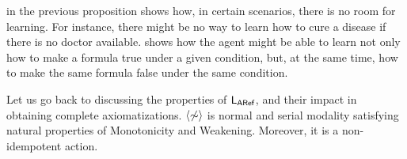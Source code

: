  in the previous proposition shows how, in certain scenarios, there is
no room for learning. For instance, there might be no way to learn how
to cure a disease if there is no doctor
available.  shows how the agent might be able
to learn not only how to make a formula true under a given condition,
but, at the same time, how to make the same formula false under the same condition.

Let us go back to discussing the properties of $\mathsf{L_{ARef}}$, and their impact in obtaining complete axiomatizations. $\langle \not\sim \rangle$ is normal and serial modality satisfying natural properties 
of Monotonicity and Weakening. Moreover, it is a non-idempotent action. 


\medskip 

